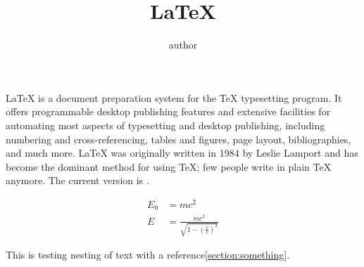 \documentclass{article} %
\title{\LaTeX} %
\author{author}
\begin{document}
  \maketitle
  \LaTeX{} is a document preparation system for
  the \TeX{} typesetting program. It offers
  programmable desktop publishing features and
  extensive facilities for automating most
  aspects of typesetting and desktop publishing,
  including numbering and  cross-referencing,
  tables and figures, page layout,
  bibliographies, and much more. \LaTeX{} was
  originally written in 1984 by Leslie Lamport
  and has become the  dominant method for using
  \TeX; few people write in plain \TeX{} anymore.
  The current version is \LaTeXe.

  \begin{align}
    E_0 &= mc^2 \\
    E &= \frac{mc^2}{\sqrt{1-\left(\frac{v}{c}\right)^2}}\label{E}
  \end{align}

  This is testing {nesting {of {text} with a reference\ref{section:something}}}.
\end{document}
